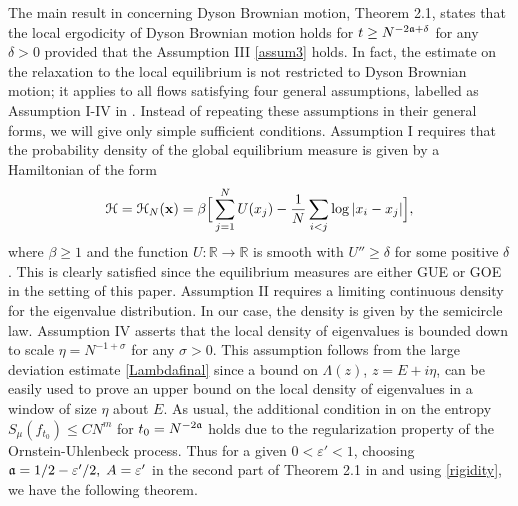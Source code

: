 \documentclass[draft]{article}
\newcommand{\fa}{{\frak a}}
\newcommand{\e}{\varepsilon}
\newcommand{\bR}{{\mathbb R}}
\newcommand{\bx}{{\bf{x}}}
\newcommand{\be}{\begin{equation}}
\newcommand{\ee}{\end{equation}}
\newcommand{\cH}{{\mathcal H}}
\numberwithin{equation}{section}
\numberwithin{theorem}{section}
\numberwithin{definition}{section}
\numberwithin{remark}{section}
\begin{document}
The main result in \cite{ESYY} concerning Dyson Brownian motion, Theorem 2.1, 
 states that the  local ergodicity of Dyson Brownian motion  holds for 
 $t \ge N^{-2\fa+\delta}$  for any $\delta > 0$ 
provided that the  Assumption III \eqref{assum3} holds.
 In fact,   the  estimate on the relaxation to the local equilibrium  \cite{ESYY} is not restricted to 
Dyson Brownian motion;  it applies to all flows satisfying { four general assumptions, labelled as Assumption I-IV 
in \cite{ESYY}. Instead of repeating  these assumptions in their general  forms, we will give only 
simple sufficient conditions.
Assumption I requires that the probability density of the global equilibrium measure} is given by 
a  Hamiltonian  of the form 
\be
  \cH = \cH_N(\bx)  = \beta\Big[ \sum_{j=1}^N U(x_j)
-\frac{1}{N}\sum_{i<j} \log|x_i-x_j| \Big], 
\label{ham}
\ee
where $\beta\ge 1$ and  the function $U:\bR\to \bR$ is smooth with
$U'' \ge \delta $ {for some positive $\delta$.}
 This is clearly satisfied since the equilibrium measures  are either GUE or GOE
in the setting of this paper.
 Assumption II requires  a limiting continuous density for the eigenvalue distribution. 
In our case, the density is given by the semicircle law. 
Assumption IV  asserts that the { local density of eigenvalues is bounded down to scale $\eta=N^{-1 + \sigma}$} for
any $\sigma > 0$. This assumption 
follows from the large deviation estimate 
\eqref{Lambdafinal} since a bound on $\Lambda(z)$, 
 $z=E+i\eta$, can be easily used to prove
an upper bound  
on the local density of eigenvalues in a window of size $\eta$ about $E$. 
 As usual, the additional
condition in \cite{ESYY} on the entropy  $S_\mu(f_{t_0})\le CN^m$ for $t_0= N^{-2\fa}$
holds due to the regularization property of the Ornstein-Uhlenbeck process. Thus  for a 
given $0<\e'<1$, choosing  $\fa = 1/2 - \e'/2, \; A = \e'$ 
in the second part of Theorem 2.1 in \cite{ESYY} and using \eqref{rigidity},
we have the following theorem. 
\end{document}
